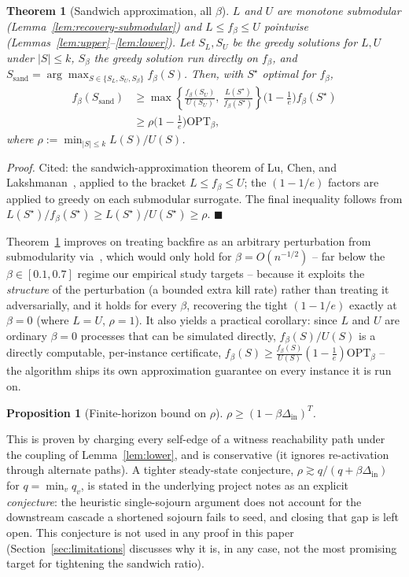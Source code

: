 \documentclass[journal]{IEEEtran}
\newtheorem{theorem}{Theorem}
\newtheorem{proposition}{Proposition}
\newcommand{\eqdef}{:=}
\begin{document}
\begin{theorem}[Sandwich approximation, all $\beta$]
\label{thm:sandwich}
$L$ and $U$ are monotone submodular (Lemma~\ref{lem:recovery-submodular})
and $L\le f_\beta\le U$ pointwise (Lemmas~\ref{lem:upper}--\ref{lem:lower}).
Let $S_L, S_U$ be the greedy solutions for $L, U$ under $|S|\le k$, $S_\beta$
the greedy solution run directly on $f_\beta$, and
$S_{\mathrm{sand}}=\arg\max_{S\in\{S_L,S_U,S_\beta\}} f_\beta(S)$. Then, with
$S^\star$ optimal for $f_\beta$,
\begin{equation}
\begin{split}
f_\beta(S_{\mathrm{sand}}) &\ge \max\left\{\frac{f_\beta(S_U)}{U(S_U)},\ \frac{L(S^\star)}{f_\beta(S^\star)}\right\}\Big(1-\frac1e\Big) f_\beta(S^\star)\\
&\ge \rho\Big(1-\frac1e\Big)\mathrm{OPT}_\beta,
\end{split}
\end{equation}
where $\rho \eqdef \min_{|S|\le k} L(S)/U(S)$.
\end{theorem}
\emph{Proof.} Cited: the sandwich-approximation theorem of Lu, Chen, and
Lakshmanan~\cite{lu2015competition}, applied to the bracket $L\le f_\beta\le U$;
the $(1-1/e)$ factors are~\cite{nemhauser1978analysis} applied to greedy on
each submodular surrogate. The final inequality follows from
$L(S^\star)/f_\beta(S^\star)\ge L(S^\star)/U(S^\star)\ge\rho$. $\blacksquare$

Theorem~\ref{thm:sandwich} improves on treating backfire as an arbitrary
perturbation from submodularity via~\cite{horel2016maximization}, which
would only hold for $\beta=O(n^{-1/2})$ -- far below the
$\beta\in[0.1,0.7]$ regime our empirical study targets -- because it
exploits the \emph{structure} of the perturbation (a bounded extra kill
rate) rather than treating it adversarially, and it holds for every
$\beta$, recovering the tight $(1-1/e)$ exactly at $\beta=0$ (where $L=U$,
$\rho=1$). It also yields a practical corollary: since $L$ and $U$ are
ordinary $\beta=0$ processes that can be simulated directly, $f_\beta(S)/U(S)$
is a directly computable, per-instance certificate,
$f_\beta(S)\ge \frac{f_\beta(S)}{U(S)}(1-\frac1e)\mathrm{OPT}_\beta$ -- the
algorithm ships its own approximation guarantee on every instance it is run
on.

\begin{proposition}[Finite-horizon bound on $\rho$]
\label{prop:rho-bound}
$\rho \ge (1-\beta\Delta_{\mathrm{in}})^T$.
\end{proposition}
This is proven by charging every self-edge of a witness reachability path
under the coupling of Lemma~\ref{lem:lower}, and is conservative (it ignores
re-activation through alternate paths). A tighter steady-state conjecture,
$\rho \gtrsim q/(q+\beta\Delta_{\mathrm{in}})$ for $q=\min_v q_v$, is stated
in the underlying project notes as an explicit \emph{conjecture}: the
heuristic single-sojourn argument does not account for the downstream
cascade a shortened sojourn fails to seed, and closing that gap is left
open. This conjecture is not used in any proof in this paper (Section~\ref{sec:limitations}
discusses why it is, in any case, not the most promising target for
tightening the sandwich ratio).
\end{document}
